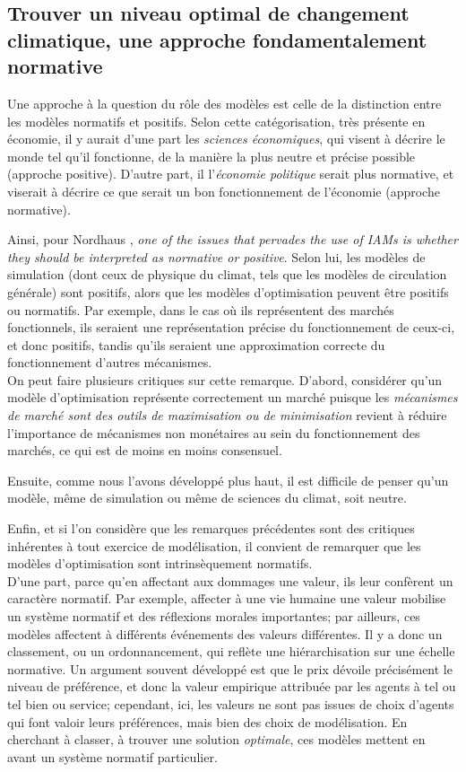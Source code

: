 \subsection{Trouver un niveau optimal de changement climatique, une approche fondamentalement normative}

Une approche à la question du rôle des modèles est celle de la distinction entre les modèles normatifs et positifs. Selon cette catégorisation, très présente en économie, il y aurait d'une part les \emph{sciences économiques}, qui visent à décrire le monde tel qu'il fonctionne, de la manière la plus neutre et précise possible (approche positive). D'autre part, il l'\emph{économie politique} serait plus normative, et viserait à décrire ce que serait un bon fonctionnement de l'économie (approche normative). 

Ainsi, pour Nordhaus \textcite{nordhaus_dice_2013}, \emph{one of the issues that pervades the use of IAMs is whether they should be interpreted as normative or positive}. Selon lui, les modèles de simulation (dont ceux de physique du climat, tels que les modèles de circulation générale) sont positifs, alors que les modèles d'optimisation peuvent être positifs ou normatifs. Par exemple, dans le cas où ils représentent des marchés fonctionnels, ils seraient une représentation précise du fonctionnement de ceux-ci, et donc positifs, tandis qu'ils seraient une approximation correcte du fonctionnement d'autres mécanismes. \\

On peut faire plusieurs critiques sur cette remarque. D'abord, considérer qu'un modèle d'optimisation représente correctement un marché puisque les \emph{mécanismes de marché sont des outils de maximisation ou de minimisation} revient à réduire l'importance de mécanismes non monétaires au sein du fonctionnement des marchés, ce qui est de moins en moins consensuel. 

Ensuite, comme nous l'avons développé plus haut, il est difficile de penser qu'un modèle, même de simulation ou même de sciences du climat, soit neutre. 

Enfin, et si l'on considère que les remarques précédentes sont des critiques inhérentes à tout exercice de modélisation, il convient de remarquer que les modèles d'optimisation sont intrinsèquement normatifs. \\

D'une part, parce qu'en affectant aux dommages une valeur, ils leur confèrent un caractère normatif. Par exemple, affecter à une vie humaine une valeur mobilise un système normatif et des réflexions morales importantes; par ailleurs, ces modèles affectent à différents événements des valeurs différentes. Il y a donc un classement, ou un ordonnancement, qui reflète une hiérarchisation sur une échelle normative. Un argument souvent développé est que le prix dévoile précisément le niveau de préférence, et donc la valeur empirique attribuée par les agents à tel ou tel bien ou service; cependant, ici, les valeurs ne sont pas issues de choix d'agents qui font valoir leurs préférences, mais bien des choix de modélisation. En cherchant à classer, à trouver une solution \emph{optimale}, ces modèles mettent en avant un système normatif particulier. 

